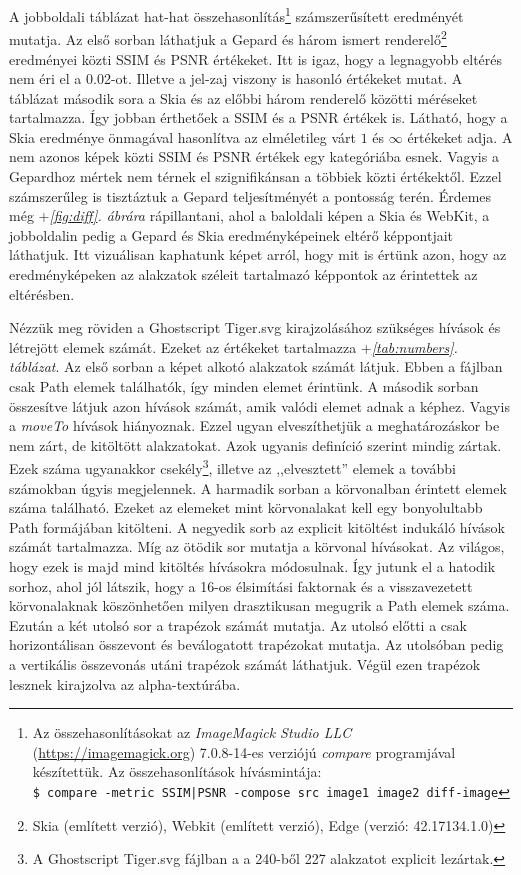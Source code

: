 \documentclass[12pt]{report}
\theoremstyle{definition}
\newcommand{\func}[1]{{\textsl{#1}}}
\begin{document}
A jobboldali táblázat hat-hat összehasonlítás\footnote{Az összehasonlításokat
az \emph{ImageMagick Studio LLC} ({\footnotesize\url{https://imagemagick.org}})
7.0.8-14-es verziójú \func{compare} programjával készítettük. Az
összehasonlítások hívásmintája:\\ \texttt{\$ compare -metric SSIM|PSNR -compose
src image1 image2 diff-image} } számszerűsített eredményét mutatja. Az első
sorban láthatjuk a Gepard és három ismert renderelő\footnote{Skia (említett
verzió), Webkit (említett verzió), Edge (verzió: 42.17134.1.0)} eredményei
közti SSIM és PSNR értékeket. Itt is igaz, hogy a legnagyobb eltérés nem éri el
a 0.02-ot. Illetve a jel-zaj viszony is hasonló értékeket mutat. A táblázat
második sora a Skia és az előbbi három renderelő közötti méréseket tartalmazza.
Így jobban érthetőek a SSIM és a PSNR értékek is. Látható, hogy a Skia
eredménye önmagával hasonlítva az elméletileg várt $1$ és $\infty$ értékeket
adja. A nem azonos képek közti SSIM és PSNR értékek egy kategóriába esnek.
Vagyis a Gepardhoz mértek nem térnek el szignifikánsan a többiek közti
értékektől. Ezzel számszerűleg is tisztáztuk a Gepard teljesítményét a
pontosság terén. Érdemes még \az+\emph{\ref{fig:diff}. ábrára} rápillantani, ahol
a baloldali képen a Skia és WebKit, a jobboldalin pedig a Gepard és Skia
eredményképeinek eltérő képpontjait láthatjuk. Itt vizuálisan kaphatunk képet
arról, hogy mit is értünk azon, hogy az eredményképeken az alakzatok széleit
tartalmazó képpontok az érintettek az eltérésben.

Nézzük meg röviden a Ghostscript Tiger.svg kirajzolásához szükséges hívások és
létrejött elemek számát. Ezeket az értékeket tartalmazza \az+\emph{\ref{tab:numbers}. táblázat}. Az első sorban a képet alkotó alakzatok
számát látjuk. Ebben a fájlban csak Path elemek találhatók, így minden elemet
érintünk. A második sorban összesítve látjuk azon hívások számát, amik valódi
elemet adnak a képhez. Vagyis a \func{moveTo} hívások hiányoznak. Ezzel ugyan
elveszíthetjük a meghatározáskor be nem zárt, de kitöltött alakzatokat. Azok
ugyanis definíció szerint mindig zártak. Ezek száma ugyanakkor
csekély\footnote{A Ghostscript Tiger.svg fájlban a a 240-ből 227 alakzatot
explicit lezártak.}, illetve az ,,elvesztett'' elemek a további számokban úgyis
megjelennek. A harmadik sorban a körvonalban érintett elemek száma található.
Ezeket az elemeket mint körvonalakat kell egy bonyolultabb Path formájában
kitölteni. A negyedik sorb az explicit kitöltést indukáló hívások számát
tartalmazza. Míg az ötödik sor mutatja a körvonal hívásokat. Az világos, hogy
ezek is majd mind kitöltés hívásokra módosulnak. Így jutunk el a hatodik
sorhoz, ahol jól látszik, hogy a 16-os élsimítási faktornak és a visszavezetett
körvonalaknak köszönhetően milyen drasztikusan megugrik a Path elemek száma.
Ezután a két utolsó sor a trapézok számát mutatja. Az utolsó előtti a csak
horizontálisan összevont és beválogatott trapézokat mutatja. Az utolsóban pedig
a vertikális összevonás utáni trapézok számát láthatjuk. Végül ezen trapézok
lesznek kirajzolva az alpha-textúrába.
\end{document}
